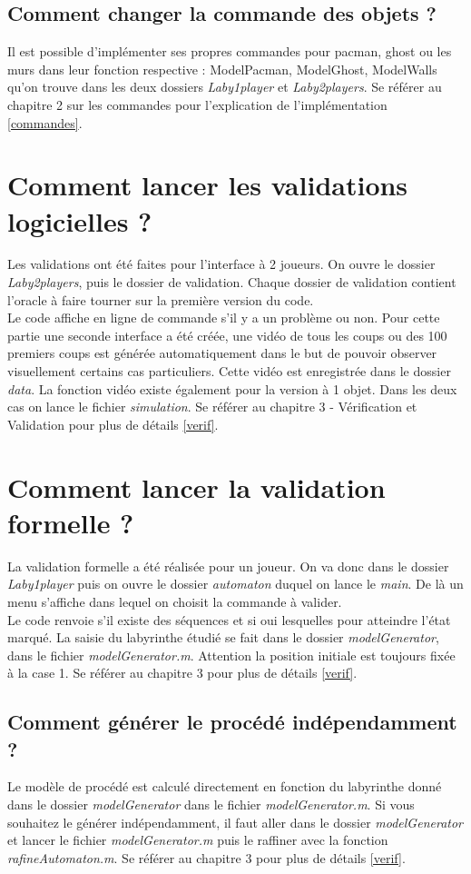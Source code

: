\subsection{Comment changer la commande des objets ?}
Il est possible d'implémenter ses propres commandes pour pacman, ghost ou les murs dans leur fonction respective : ModelPacman, ModelGhost, ModelWalls qu'on trouve dans les deux dossiers \emph{Laby1player} et \emph{Laby2players}. Se référer au chapitre 2 sur les commandes pour l'explication de l'implémentation \ref{commandes}.

\section{Comment lancer les validations logicielles ?}
Les validations ont été faites pour l'interface à 2 joueurs. On ouvre le dossier  \emph{Laby2players}, puis le dossier de validation. Chaque dossier de validation contient l'oracle à faire tourner sur la première version du code.\\
Le code affiche en ligne de commande s'il y a un problème ou non. Pour cette partie une seconde interface a été créée, une vidéo de tous les coups ou des 100 premiers coups est générée automatiquement dans le but de pouvoir observer visuellement certains cas particuliers. Cette vidéo est enregistrée dans le dossier \emph{data}. La fonction vidéo existe également pour la version à 1 objet. Dans les deux cas on lance le fichier \emph{simulation}. Se référer au chapitre 3 - Vérification et Validation pour plus de détails \ref{verif}.


\section{Comment lancer la validation formelle ?}
La validation formelle a été réalisée pour un joueur. On va donc dans le dossier \emph{Laby1player} puis on ouvre le dossier \emph{automaton} duquel on lance le \emph{main}. De là un menu s'affiche dans lequel on choisit la commande à valider.\\
Le code renvoie s'il existe des séquences et si oui lesquelles pour atteindre l'état marqué. La saisie du labyrinthe étudié se fait dans le dossier \emph{modelGenerator}, dans le fichier \emph{modelGenerator.m}. Attention la position initiale est toujours fixée à la case 1. Se référer au chapitre 3 pour plus de détails \ref{verif}.

\subsection{Comment générer le procédé indépendamment ?}
Le modèle de procédé est calculé directement en fonction du labyrinthe donné dans le dossier \emph{modelGenerator} dans le fichier \emph{modelGenerator.m}. Si vous souhaitez le générer indépendamment, il faut aller dans le dossier \emph{modelGenerator} et lancer le fichier \emph{modelGenerator.m} puis le raffiner avec la fonction \emph{rafineAutomaton.m}. Se référer au chapitre 3 pour plus de détails \ref{verif}.

